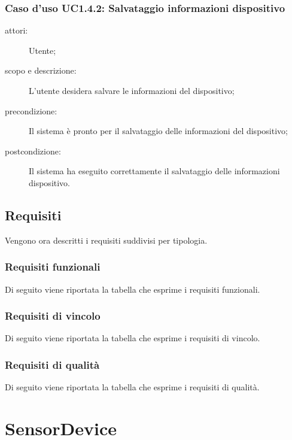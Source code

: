 \subsubsection{Caso d'uso UC1.4.2: Salvataggio informazioni dispositivo}
\begin{description}
\item[attori:] Utente;
\item[scopo e descrizione:] L'utente desidera salvare le informazioni del dispositivo;
\item[precondizione:] Il sistema è pronto per il salvataggio delle informazioni del dispositivo;
\item[postcondizione:] Il sistema ha eseguito correttamente il salvataggio delle informazioni dispositivo.
\end{description}

\subsection{Requisiti}
Vengono ora descritti i requisiti suddivisi per tipologia.

\subsubsection{Requisiti funzionali}
Di seguito viene riportata la tabella che esprime i requisiti funzionali.


\subsubsection{Requisiti di vincolo}
Di seguito viene riportata la tabella che esprime i requisiti di vincolo.


%

\subsubsection{Requisiti di qualità}
Di seguito viene riportata la tabella che esprime i requisiti di qualità.


\section{SensorDevice}
